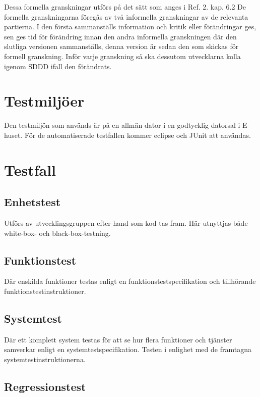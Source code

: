 \documentclass[a4paper]{article}
\begin{document}
Dessa formella granskningar utförs på det sätt som anges i Ref. 2. kap. 6.2 De formella granskningarna föregås av två informella granskningar av de relevanta partierna. I den första sammanställs information och kritik eller förändringar ges, sen ges tid för förändring innan den andra informella granskningen där den slutliga versionen sammanställs, denna version är sedan den som skickas för formell granskning. Inför varje granskning så ska dessutom utvecklarna kolla igenom SDDD ifall den förändrats.


\section{Testmiljöer}

Den testmiljön som används är på en allmän dator i en godtycklig datorsal i E-huset. För de automatiserade testfallen kommer eclipse och JUnit att användas.

\section{Testfall}

\subsection{Enhetstest}

Utförs av utvecklingsgruppen efter hand som kod tas fram. Här utnyttjas både white-box- och black-box-testning.

\subsection{Funktionstest}

Där enskilda funktioner testas enligt en funktionstestspecifikation och tillhörande funktionstestinstruktioner. 

\subsection{Systemtest}

Där ett komplett system testas för att se hur flera funktioner och tjänster samverkar enligt en systemtestspecifikation. Testen i enlighet med de framtagna systemtestinstruktionerna. 

\subsection{Regressionstest}
\end{document}
